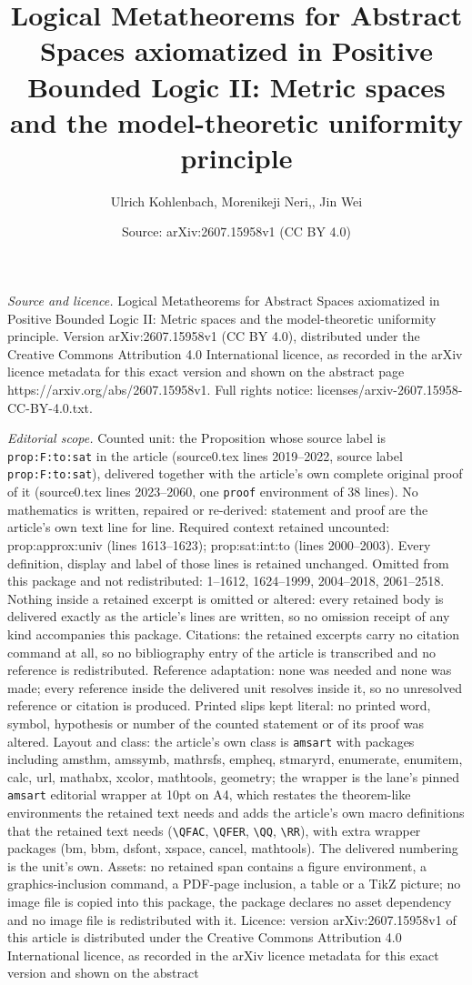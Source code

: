 \documentclass[10pt,a4paper]{amsart}
\title[Logical Metatheorems for Abstract Spaces axiomatized in Posi]{Logical Metatheorems for Abstract Spaces axiomatized in Positive Bounded Logic II: Metric spaces and the model-theoretic uniformity principle}
\author{Ulrich Kohlenbach, Morenikeji Neri,, Jin Wei}
\date{Source: arXiv:2607.15958v1 (CC BY 4.0)}
\begin{document}
\maketitle

\noindent\emph{Source and licence.} Logical Metatheorems for Abstract Spaces axiomatized in Positive Bounded Logic II: Metric spaces and the model-theoretic uniformity principle. Version arXiv:2607.15958v1 (CC BY 4.0), distributed under the Creative Commons Attribution 4.0 International licence, as recorded in the arXiv licence metadata for this exact version and shown on the abstract page https://arxiv.org/abs/2607.15958v1. Full rights notice: licenses/arxiv-2607.15958-CC-BY-4.0.txt.\par\smallskip

\noindent\textit{Editorial scope.} Counted unit: the Proposition whose source label is \texttt{prop:F:to:sat} in the article (source0.tex lines 2019--2022, source label \texttt{prop:F:to:sat}), delivered together with the article's own complete original proof of it (source0.tex lines 2023--2060, one \texttt{proof} environment of 38 lines). No mathematics is written, repaired or re-derived: statement and proof are the article's own text line for line. Required context retained uncounted: prop:approx:univ (lines 1613--1623); prop:sat:int:to (lines 2000--2003). Every definition, display and label of those lines is retained unchanged. Omitted from this package and not redistributed: 1--1612, 1624--1999, 2004--2018, 2061--2518. Nothing inside a retained excerpt is omitted or altered: every retained body is delivered exactly as the article's lines are written, so no omission receipt of any kind accompanies this package. Citations: the retained excerpts carry no citation command at all, so no bibliography entry of the article is transcribed and no reference is redistributed. Reference adaptation: none was needed and none was made; every reference inside the delivered unit resolves inside it, so no unresolved reference or citation is produced. Printed slips kept literal: no printed word, symbol, hypothesis or number of the counted statement or of its proof was altered. Layout and class: the article's own class is \texttt{amsart} with packages including amsthm, amssymb, mathrsfs, empheq, stmaryrd, enumerate, enumitem, calc, url, mathabx, xcolor, mathtools, geometry; the wrapper is the lane's pinned \texttt{amsart} editorial wrapper at 10pt on A4, which restates the theorem-like environments the retained text needs and adds the article's own macro definitions that the retained text needs (\texttt{\textbackslash QFAC}, \texttt{\textbackslash QFER}, \texttt{\textbackslash QQ}, \texttt{\textbackslash RR}), with extra wrapper packages (bm, bbm, dsfont, xspace, cancel, mathtools). The delivered numbering is the unit's own. Assets: no retained span contains a figure environment, a graphics-inclusion command, a PDF-page inclusion, a table or a TikZ picture; no image file is copied into this package, the package declares no asset dependency and no image file is redistributed with it. Licence: version arXiv:2607.15958v1 of this article is distributed under the Creative Commons Attribution 4.0 International licence, as recorded in the arXiv licence metadata for this exact version and shown on the abstract 
\end{document}
